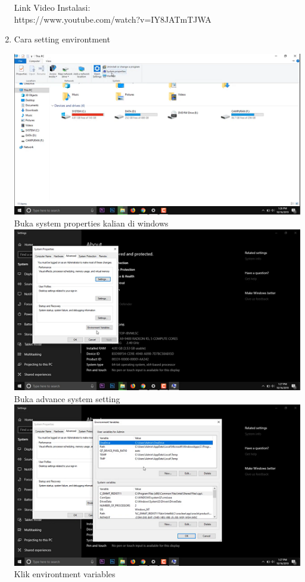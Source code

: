 \begin{enumerate}
Link Video Instalasi: \\
https://www.youtube.com/watch?v=IY8JATmTJWA

\item Cara setting environtment 

\includegraphics{gambar/3_1.png}
Buka system properties kalian di windows\\

\includegraphics{gambar/3_2.png}
Buka advance system setting\\

\includegraphics{gambar/3_3.png}
Klik environtment variables\\


\end{enumerate}
